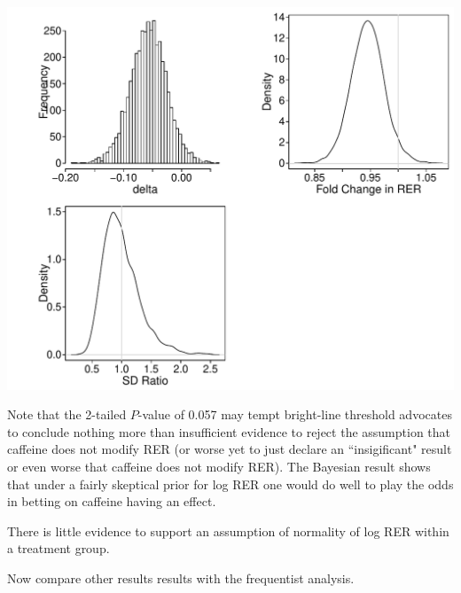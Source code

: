 \begin{Schunk}
\centerline{\includegraphics[width=\maxwidth]{htest-bayesfit2e-1} }

\end{Schunk}

Note that the
2-tailed $P$-value of 0.057 may tempt bright-line threshold advocates
to conclude nothing more than insufficient evidence to reject the
assumption that caffeine does not modify RER (or worse yet to just declare
an ``insigificant" result or even worse that caffeine does not modify
RER).  The Bayesian result shows that under a fairly skeptical prior
for log RER one would do well to play the odds in betting on caffeine
having an effect.

There is little evidence to support an assumption of normality of log
RER within a treatment group.

Now compare other results results with the frequentist analysis.  

